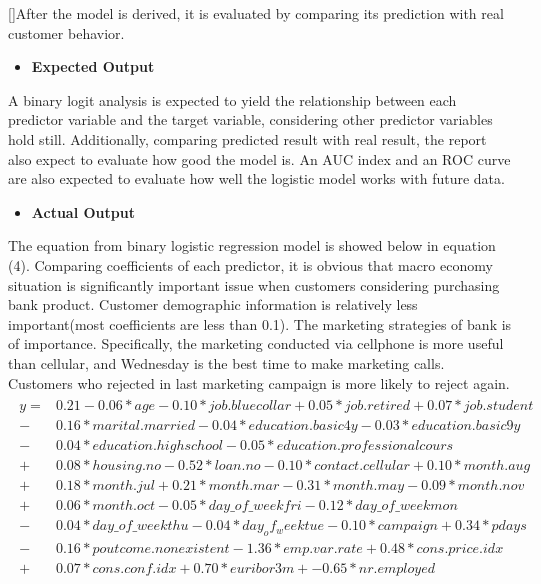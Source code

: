        [\baselineskip]\indent After the model is derived, it is evaluated by comparing its prediction with real customer behavior. \\
       \begin{itemize}
       	\item \textbf{Expected Output}
       \end{itemize}
   A binary logit analysis is expected to yield the relationship between each predictor variable and the target variable, considering other predictor variables hold still. Additionally, comparing predicted result with real result, the report also expect to evaluate how good the model is. An AUC index and an ROC curve are also expected to evaluate how well the logistic model works with future data.\\   
\begin{itemize}
	\item \textbf{Actual Output}
\end{itemize}
  \noindent The equation from binary logistic regression model is showed below in equation (4). Comparing coefficients of each predictor, it is obvious that macro economy situation is significantly important issue when customers considering purchasing bank product. Customer demographic information is relatively less important(most coefficients are less than 0.1). The marketing strategies of bank is of importance. Specifically, the marketing conducted via cellphone is more useful than cellular, and Wednesday is the best time to make marketing calls. Customers who rejected in last marketing campaign is more likely to reject again. \\
  \begin{eqnarray}\label{}
  \begin{split}
  y =& 0.21-0.06\ast{age}-0.10\ast{job.bluecollar}+0.05\ast{job.retired}+0.07\ast{job.student}\\
  - &0.16\ast{marital.married}-0.04\ast{education.basic4y}-0.03\ast{education.basic9y}\\
  - &0.04\ast{education.highschool}-0.05\ast{education.professionalcours}\\
  + &0.08\ast{housing.no}-0.52\ast{loan.no}-0.10\ast{contact.cellular}+0.10\ast{month.aug}\\
  + &0.18\ast{month.jul}+0.21\ast{month.mar}-0.31\ast{month.may}-0.09\ast{month.nov}\\
  + &0.06\ast{month.oct}-0.05\ast{day\_of\_weekfri}-0.12\ast{day\_of\_weekmon}\\
  - &0.04\ast{day\_of\_weekthu}-0.04\ast{day_of_weektue}-0.10\ast{campaign}+0.34\ast{pdays}\\
  - &0.16\ast{poutcome.nonexistent}-1.36\ast{emp.var.rate}+ 0.48\ast{cons.price.idx} \\
  + &0.07\ast{cons.conf.idx}+0.70\ast{euribor3m}+-0.65\ast{nr.employed}
  \end{split}
  \end{eqnarray}
